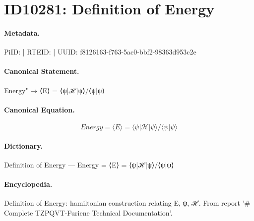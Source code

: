 \section*{ID10281: Definition of Energy}
\paragraph{Metadata.}
PiID:  | RTEID:  | UUID: f8126163-f763-5ac0-bbf2-98363d953c2e

\paragraph{Canonical Statement.}
Energy" → ⟨E⟩ = ⟨ψ|ℋ|ψ⟩/⟨ψ|ψ⟩

\paragraph{Canonical Equation.}
\[
Energy = ⟨E⟩ = ⟨ψ|ℋ|ψ⟩/⟨ψ|ψ⟩
\]

\paragraph{Dictionary.}
Definition of Energy — Energy = ⟨E⟩ = ⟨ψ|ℋ|ψ⟩/⟨ψ|ψ⟩

\paragraph{Encyclopedia.}
Definition of Energy: hamiltonian construction relating E, ψ, ℋ. From report '\# Complete TZPQVT-Furiene Technical Documentation'.
